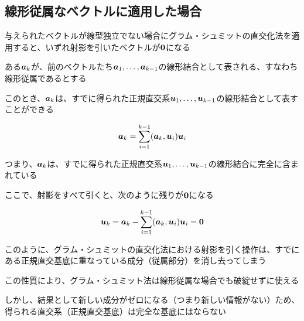 \documentclass[../../../topic_linear-algebra]{subfiles}
\begin{document}
\subsection{線形従属なベクトルに適用した場合}\label{sec:gram-schmidt-with-dependent-vectors}

与えられたベクトルが線型独立でない場合にグラム・シュミットの直交化法を適用すると、いずれ射影を引いたベクトルが$\vb*{0}$になる

\br

ある$\vb*{a}_k$が、前のベクトルたち$\vb*{a}_1,\ldots,\vb*{a}_{k-1}$の線形結合として表される、すなわち線形従属であるとする

このとき、$\vb*{a}_k$は、すでに得られた正規直交系$\vb*{u}_1,\ldots,\vb*{u}_{k-1}$の線形結合として表すことができる

\begin{equation*}
  \vb*{a}_k = \sum_{i = 1}^{k-1}(\vb*{a}_k, \vb*{u}_i) \vb*{u}_i
\end{equation*}

つまり、$\vb*{a}_k$は、すでに得られた正規直交系$\vb*{u}_1,\ldots,\vb*{u}_{k-1}$の線形結合に完全に含まれている

ここで、射影をすべて引くと、次のように残りが$\vb*{0}$になる

\begin{equation*}
  \vb*{u}_k = \vb*{a}_k - \sum_{i=1}^{k-1}(\vb*{a}_k, \vb*{u}_i) \vb*{u}_i = \vb*{0}
\end{equation*}

\br

このように、グラム・シュミットの直交化法における射影を引く操作は、すでにある正規直交基底に重なっている成分（従属部分）を消し去ってしまう

この性質により、グラム・シュミット法は線形従属な場合でも破綻せずに使える

\br

しかし、結果として新しい成分がゼロになる（つまり新しい情報がない）ため、得られる直交系（正規直交基底）は完全な基底にはならない
\end{document}
